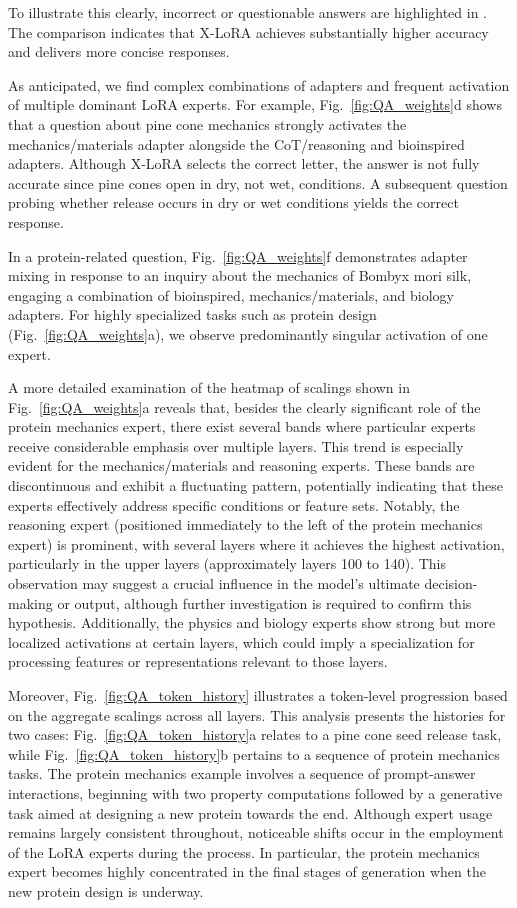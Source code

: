To illustrate this clearly, incorrect or questionable answers are highlighted in . The comparison indicates that X-LoRA achieves substantially higher accuracy and delivers more concise responses.

As anticipated, we find complex combinations of adapters and frequent activation of multiple dominant LoRA experts. For example, Fig.~\ref{fig:QA_weights}d shows that a question about pine cone mechanics strongly activates the mechanics/materials adapter alongside the CoT/reasoning and bioinspired adapters. Although X-LoRA selects the correct letter, the answer is not fully accurate since pine cones open in dry, not wet, conditions. A subsequent question probing whether release occurs in dry or wet conditions yields the correct response.

In a protein-related question, Fig.~\ref{fig:QA_weights}f demonstrates adapter mixing in response to an inquiry about the mechanics of Bombyx mori silk, engaging a combination of bioinspired, mechanics/materials, and biology adapters. For highly specialized tasks such as protein design (Fig.~\ref{fig:QA_weights}a), we observe predominantly singular activation of one expert.

A more detailed examination of the heatmap of scalings shown in Fig.~\ref{fig:QA_weights}a reveals that, besides the clearly significant role of the protein mechanics expert, there exist several bands where particular experts receive considerable emphasis over multiple layers. This trend is especially evident for the mechanics/materials and reasoning experts. These bands are discontinuous and exhibit a fluctuating pattern, potentially indicating that these experts effectively address specific conditions or feature sets. Notably, the reasoning expert (positioned immediately to the left of the protein mechanics expert) is prominent, with several layers where it achieves the highest activation, particularly in the upper layers (approximately layers 100 to 140). This observation may suggest a crucial influence in the model’s ultimate decision-making or output, although further investigation is required to confirm this hypothesis. Additionally, the physics and biology experts show strong but more localized activations at certain layers, which could imply a specialization for processing features or representations relevant to those layers.

Moreover, Fig.~\ref{fig:QA_token_history} illustrates a token-level progression based on the aggregate scalings across all layers. This analysis presents the histories for two cases: Fig.~\ref{fig:QA_token_history}a relates to a pine cone seed release task, while Fig.~\ref{fig:QA_token_history}b pertains to a sequence of protein mechanics tasks. The protein mechanics example involves a sequence of prompt-answer interactions, beginning with two property computations followed by a generative task aimed at designing a new protein towards the end. Although expert usage remains largely consistent throughout, noticeable shifts occur in the employment of the LoRA experts during the process. In particular, the protein mechanics expert becomes highly concentrated in the final stages of generation when the new protein design is underway.

